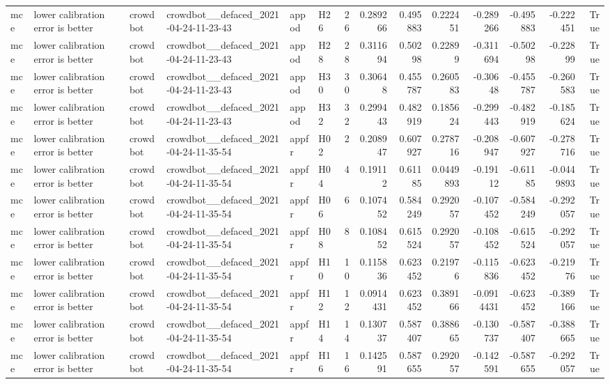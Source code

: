 \begin{longtable}{llllllrrrrrrrr}
mce & lower calibration error is better & crowdbot & crowdbot\_\_defaced\_2021-04-24-11-23-43 & appod & H26 & 26 & 0.289266 & 0.495883 & 0.222451 & -0.289266 & -0.495883 & -0.222451 & True \\
mce & lower calibration error is better & crowdbot & crowdbot\_\_defaced\_2021-04-24-11-23-43 & appod & H28 & 28 & 0.311694 & 0.50298 & 0.22899 & -0.311694 & -0.50298 & -0.22899 & True \\
mce & lower calibration error is better & crowdbot & crowdbot\_\_defaced\_2021-04-24-11-23-43 & appod & H30 & 30 & 0.30648 & 0.455787 & 0.260583 & -0.30648 & -0.455787 & -0.260583 & True \\
mce & lower calibration error is better & crowdbot & crowdbot\_\_defaced\_2021-04-24-11-23-43 & appod & H32 & 32 & 0.299443 & 0.482919 & 0.185624 & -0.299443 & -0.482919 & -0.185624 & True \\
mce & lower calibration error is better & crowdbot & crowdbot\_\_defaced\_2021-04-24-11-35-54 & appfr & H02 & 2 & 0.208947 & 0.607927 & 0.278716 & -0.208947 & -0.607927 & -0.278716 & True \\
mce & lower calibration error is better & crowdbot & crowdbot\_\_defaced\_2021-04-24-11-35-54 & appfr & H04 & 4 & 0.19112 & 0.61185 & 0.0449893 & -0.19112 & -0.61185 & -0.0449893 & True \\
mce & lower calibration error is better & crowdbot & crowdbot\_\_defaced\_2021-04-24-11-35-54 & appfr & H06 & 6 & 0.107452 & 0.584249 & 0.292057 & -0.107452 & -0.584249 & -0.292057 & True \\
mce & lower calibration error is better & crowdbot & crowdbot\_\_defaced\_2021-04-24-11-35-54 & appfr & H08 & 8 & 0.108452 & 0.615524 & 0.292057 & -0.108452 & -0.615524 & -0.292057 & True \\
mce & lower calibration error is better & crowdbot & crowdbot\_\_defaced\_2021-04-24-11-35-54 & appfr & H10 & 10 & 0.115836 & 0.623452 & 0.21976 & -0.115836 & -0.623452 & -0.21976 & True \\
mce & lower calibration error is better & crowdbot & crowdbot\_\_defaced\_2021-04-24-11-35-54 & appfr & H12 & 12 & 0.0914431 & 0.623452 & 0.389166 & -0.0914431 & -0.623452 & -0.389166 & True \\
mce & lower calibration error is better & crowdbot & crowdbot\_\_defaced\_2021-04-24-11-35-54 & appfr & H14 & 14 & 0.130737 & 0.587407 & 0.388665 & -0.130737 & -0.587407 & -0.388665 & True \\
mce & lower calibration error is better & crowdbot & crowdbot\_\_defaced\_2021-04-24-11-35-54 & appfr & H16 & 16 & 0.142591 & 0.587655 & 0.292057 & -0.142591 & -0.587655 & -0.292057 & True \\

\end{longtable}
